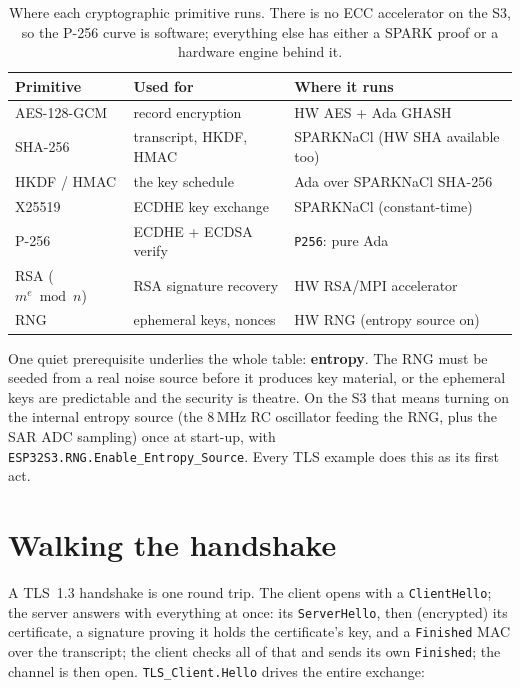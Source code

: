 \begin{table}[ht]
\centering
\small
\begin{tabular}{l l l}
\toprule
\textbf{Primitive} & \textbf{Used for} & \textbf{Where it runs} \\
\midrule
AES-128-GCM        & record encryption        & HW AES + Ada GHASH \\
SHA-256            & transcript, HKDF, HMAC   & SPARKNaCl (HW SHA available too) \\
HKDF / HMAC        & the key schedule         & Ada over SPARKNaCl SHA-256 \\
X25519             & ECDHE key exchange       & SPARKNaCl (constant-time) \\
P-256              & ECDHE + ECDSA verify     & \texttt{P256}: pure Ada \\
RSA ($m^e \bmod n$) & RSA signature recovery  & HW RSA/MPI accelerator \\
RNG                & ephemeral keys, nonces   & HW RNG (entropy source on) \\
\bottomrule
\end{tabular}
\caption{Where each cryptographic primitive runs. There is no ECC accelerator on
the S3, so the P-256 curve is software; everything else has either a SPARK proof
or a hardware engine behind it.}
\label{tab:tls-crypto}
\end{table}

One quiet prerequisite underlies the whole table: \textbf{entropy}. The RNG must be
seeded from a real noise source before it produces key material, or the ephemeral
keys are predictable and the security is theatre. On the S3 that means turning on
the internal entropy source (the 8\,MHz RC oscillator feeding the RNG, plus the SAR
ADC sampling) once at start-up, with \texttt{ESP32S3.RNG.Enable\_Entropy\_Source}.
Every TLS example does this as its first act.

\section{Walking the handshake}
\label{ch:tls:handshake}

A TLS~1.3 handshake is one round trip. The client opens with a
\texttt{ClientHello}; the server answers with everything at once: its
\texttt{ServerHello}, then (encrypted) its certificate, a signature proving it
holds the certificate's key, and a \texttt{Finished} MAC over the transcript; the
client checks all of that and sends its own \texttt{Finished}; the channel is then
open. \texttt{TLS\_Client.Hello} drives the entire exchange:


